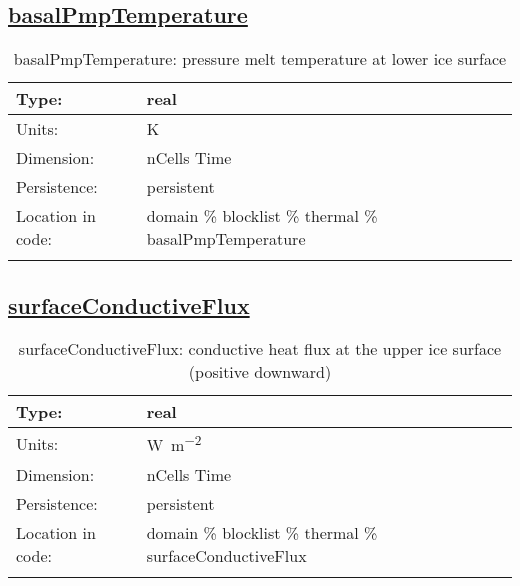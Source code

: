 \subsection[basalPmpTemperature]{\hyperref[sec:var_tab_thermal]{basalPmpTemperature}}
\label{subsec:var_sec_thermal_basalPmpTemperature}
\begin{center}
\begin{longtable}{| p{2.0in} | p{4.0in} |}
        \hline 
        Type: & real \\
        \hline 
        Units: & \si{K} \\
        \hline 
        Dimension: & nCells Time \\
        \hline 
        Persistence: & persistent \\
        \hline 
         Location in code: & domain \% blocklist \% thermal \% basalPmpTemperature \\
         \hline 
    \caption{basalPmpTemperature: pressure melt temperature at lower ice surface}
\end{longtable}
\end{center}
\subsection[surfaceConductiveFlux]{\hyperref[sec:var_tab_thermal]{surfaceConductiveFlux}}
\label{subsec:var_sec_thermal_surfaceConductiveFlux}
\begin{center}
\begin{longtable}{| p{2.0in} | p{4.0in} |}
        \hline 
        Type: & real \\
        \hline 
        Units: & \si{W.m^{-2}} \\
        \hline 
        Dimension: & nCells Time \\
        \hline 
        Persistence: & persistent \\
        \hline 
         Location in code: & domain \% blocklist \% thermal \% surfaceConductiveFlux \\
         \hline 
    \caption{surfaceConductiveFlux: conductive heat flux at the upper ice surface (positive downward)}
\end{longtable}
\end{center}
